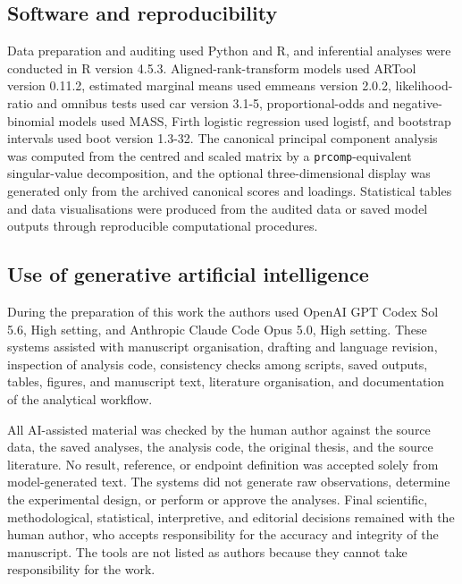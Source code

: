 \documentclass[12pt,a4paper]{article}
\begin{document}
\subsection{Software and reproducibility}
\label{sec:software}
Data preparation and auditing used Python and R, and inferential analyses were conducted in R version 4.5.3. Aligned-rank-transform models used ARTool version 0.11.2, estimated marginal means used emmeans version 2.0.2, likelihood-ratio and omnibus tests used car version 3.1-5, proportional-odds and negative-binomial models used MASS, Firth logistic regression used logistf, and bootstrap intervals used boot version 1.3-32. The canonical principal component analysis was computed from the centred and scaled matrix by a \texttt{prcomp}-equivalent singular-value decomposition, and the optional three-dimensional display was generated only from the archived canonical scores and loadings. Statistical tables and data visualisations were produced from the audited data or saved model outputs through reproducible computational procedures.

\subsection{Use of generative artificial intelligence}
\label{sec:ai-disclosure}
During the preparation of this work the authors used OpenAI GPT Codex Sol 5.6, High setting, and Anthropic Claude Code Opus 5.0, High setting. These systems assisted with manuscript organisation, drafting and language revision, inspection of analysis code, consistency checks among scripts, saved outputs, tables, figures, and manuscript text, literature organisation, and documentation of the analytical workflow.

All AI-assisted material was checked by the human author against the source data, the saved analyses, the analysis code, the original thesis, and the source literature. No result, reference, or endpoint definition was accepted solely from model-generated text. The systems did not generate raw observations, determine the experimental design, or perform or approve the analyses. Final scientific, methodological, statistical, interpretive, and editorial decisions remained with the human author, who accepts responsibility for the accuracy and integrity of the manuscript. The tools are not listed as authors because they cannot take responsibility for the work.
\end{document}
